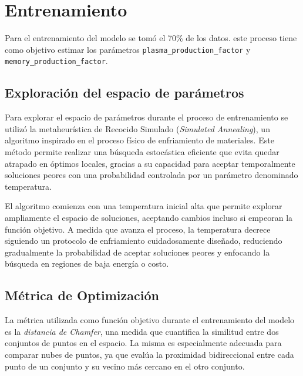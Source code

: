 \section{Entrenamiento}
Para el entrenamiento del modelo se tomó el 70\% de los datos. este proceso tiene como objetivo estimar los parámetros \texttt{plasma\_production\_factor} y \texttt{memory\_production\_factor}.

\subsection{Exploración del espacio de parámetros}

Para explorar el espacio de parámetros durante el proceso de entrenamiento se utilizó la metaheurística de Recocido Simulado (\textit{Simulated Annealing}), un algoritmo inspirado en el proceso físico de enfriamiento de materiales. Este método permite realizar una búsqueda estocástica eficiente que evita quedar atrapado en óptimos locales, gracias a su capacidad para aceptar temporalmente soluciones peores con una probabilidad controlada por un parámetro denominado temperatura.

El algoritmo comienza con una temperatura inicial alta que permite explorar ampliamente el espacio de soluciones, aceptando cambios incluso si empeoran la función objetivo. A medida que avanza el proceso, la temperatura decrece siguiendo un protocolo de enfriamiento cuidadosamente diseñado, reduciendo gradualmente la probabilidad de aceptar soluciones peores y enfocando la búsqueda en regiones de baja energía o costo.



\subsection{Métrica de Optimización}

La métrica utilizada como función objetivo durante el entrenamiento del modelo es la \textit{distancia de Chamfer}, una medida que cuantifica la similitud entre dos conjuntos de puntos en el espacio. La misma es especialmente adecuada para comparar nubes de puntos, ya que evalúa la proximidad bidireccional entre cada punto de un conjunto y su vecino más cercano en el otro conjunto.

